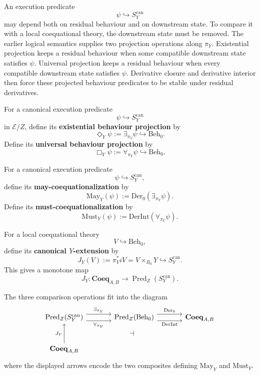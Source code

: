 An execution predicate
\[
  \psi\hookrightarrow S^{\mathrm{can}}_Y
\]
may depend both on residual behaviour and on downstream state.  To compare it
with a local coequational theory, the downstream state must be removed.  The
earlier logical semantics supplies two projection operations along
\(\pi_Y\).  Existential projection keeps a residual behaviour when some
compatible downstream state satisfies \(\psi\).  Universal projection keeps a
residual behaviour when every compatible downstream state satisfies \(\psi\).
Derivative closure and derivative interior then force these projected
behaviour predicates to be stable under residual derivatives.

\begin{definition}
\label{def:existential-universal-behaviour-projections}
For a canonical execution predicate
\[
  \psi\hookrightarrow S^{\mathrm{can}}_Y
\]
in \(\mathcal E/Z\), define its \textbf{existential behaviour projection} by
\[
  \Diamond_Y\psi
  :=
  \exists_{\pi_Y}\psi
  \hookrightarrow
  \mathrm{Beh}_0.
\]
Define its \textbf{universal behaviour projection} by
\[
  \Box_Y\psi
  :=
  \forall_{\pi_Y}\psi
  \hookrightarrow
  \mathrm{Beh}_0.
\]
\end{definition}

\begin{definition}
\label{def:may-must-coequationalization}
For a canonical execution predicate
\[
  \psi\hookrightarrow S^{\mathrm{can}}_Y,
\]
define its \textbf{may-coequationalization} by
\[
  \mathrm{May}_Y(\psi)
  :=
  \mathrm{Der}_0(\exists_{\pi_Y}\psi).
\]
Define its \textbf{must-coequationalization} by
\[
  \mathrm{Must}_Y(\psi)
  :=
  \mathrm{DerInt}(\forall_{\pi_Y}\psi).
\]
\end{definition}

\begin{definition}
\label{def:execution-extension-coequational-theory}
For a local coequational theory
\[
  V\hookrightarrow \mathrm{Beh}_0,
\]
define its \textbf{canonical \(Y\)-extension} by
\[
  J_Y(V)
  :=
  \pi_Y^*iV
  =
  V\times_{B_0}Y
  \hookrightarrow
  S^{\mathrm{can}}_Y.
\]
This gives a monotone map
\[
  J_Y:\mathbf{Coeq}_{A,B}
  \longrightarrow
  \operatorname{Pred}_Z(S^{\mathrm{can}}_Y).
\]
\end{definition}

The three comparison operations fit into the diagram
\[
\begin{tikzcd}[column sep=large,row sep=large]
\operatorname{Pred}_Z(S^{\mathrm{can}}_Y)
  \arrow[r, shift left=1.1ex, "\exists_{\pi_Y}"]
  \arrow[r, shift right=1.1ex, "\forall_{\pi_Y}"']
&
\operatorname{Pred}_Z(\mathrm{Beh}_0)
  \arrow[r, shift left=1.1ex, "\mathrm{Der}_0"]
  \arrow[r, shift right=1.1ex, "\mathrm{DerInt}"']
&
\mathbf{Coeq}_{A,B}
\\
\mathbf{Coeq}_{A,B}
  \arrow[u, "J_Y"]
  \arrow[urr, phantom, "\dashv"]
\end{tikzcd}
\]
where the displayed arrows encode the two composites defining
\(\mathrm{May}_Y\) and \(\mathrm{Must}_Y\).

